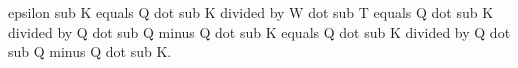 epsilon sub K equals Q dot sub K divided by W dot sub T equals Q dot sub K divided by Q dot sub Q minus Q dot sub K equals Q dot sub K divided by Q dot sub Q minus Q dot sub K.
